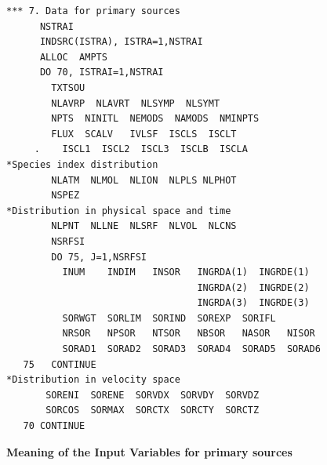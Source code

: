\begin{lstlisting}
*** 7. Data for primary sources
      NSTRAI
      INDSRC(ISTRA), ISTRA=1,NSTRAI
      ALLOC  AMPTS
      DO 70, ISTRAI=1,NSTRAI
        TXTSOU
        NLAVRP  NLAVRT  NLSYMP  NLSYMT
        NPTS  NINITL  NEMODS  NAMODS  NMINPTS
        FLUX  SCALV   IVLSF  ISCLS  ISCLT
     .    ISCL1  ISCL2  ISCL3  ISCLB  ISCLA
*Species index distribution
        NLATM  NLMOL  NLION  NLPLS NLPHOT
        NSPEZ
*Distribution in physical space and time
        NLPNT  NLLNE  NLSRF  NLVOL  NLCNS
        NSRFSI
        DO 75, J=1,NSRFSI
          INUM    INDIM   INSOR   INGRDA(1)  INGRDE(1)
                                  INGRDA(2)  INGRDE(2)
                                  INGRDA(3)  INGRDE(3)
          SORWGT  SORLIM  SORIND  SOREXP  SORIFL
          NRSOR   NPSOR   NTSOR   NBSOR   NASOR   NISOR
          SORAD1  SORAD2  SORAD3  SORAD4  SORAD5  SORAD6
   75   CONTINUE
*Distribution in velocity space
       SORENI  SORENE  SORVDX  SORVDY  SORVDZ
       SORCOS  SORMAX  SORCTX  SORCTY  SORCTZ
   70 CONTINUE
\end{lstlisting} 

\newpage 

\textbf{Meaning of the Input Variables for primary sources} 

\medskip 

